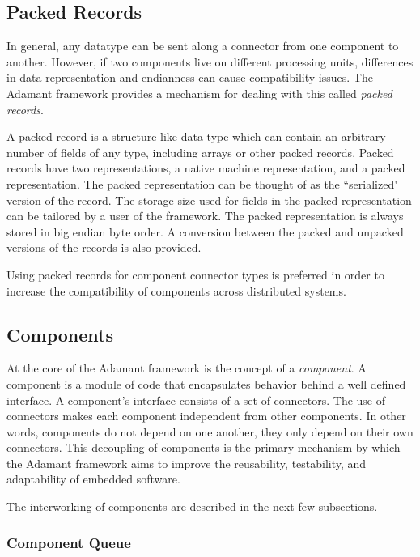 \subsection{Packed Records}

In general, any datatype can be sent along a connector from one component to another. However, if two components live on different processing units, differences in data representation and endianness can cause compatibility issues. The Adamant framework provides a mechanism for dealing with this called \textit{packed records}.

A packed record is a structure-like data type which can contain an arbitrary number of fields of any type, including arrays or other packed records. Packed records have two representations, a native machine representation, and a packed representation. The packed representation can be thought of as the ``serialized" version of the record. The storage size used for fields in the packed representation can be tailored by a user of the framework. The packed representation is always stored in big endian byte order. A conversion between the packed and unpacked versions of the records is also provided.

Using packed records for component connector types is preferred in order to increase the compatibility of components across distributed systems.

\subsection{Components}

At the core of the Adamant framework is the concept of a \textit{component}. A component is a module of code that encapsulates behavior behind a well defined interface. A component's interface consists of a set of connectors. The use of connectors makes each component independent from other components. In other words, components do not depend on one another, they only depend on their own connectors. This decoupling of components is the primary mechanism by which the Adamant framework aims to improve the reusability, testability, and adaptability of embedded software.

The interworking of components are described in the next few subsections.

\subsubsection{Component Queue}

